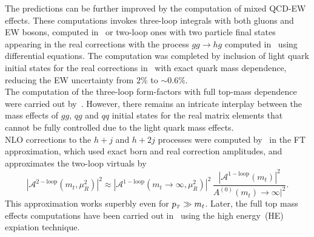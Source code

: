 The predictions can be further improved by the computation of mixed QCD-EW effects. These computations invokes three-loop integrals with both gluons and EW bosons, computed in~\cite{Bonetti:2017ovy} or two-loop ones with two particle final states appearing in the real corrections with the process $ gg \to hg$ computed in~\cite{Bonetti:2020hqh} using differential equations. The computation was completed by inclusion of light quark initial states for the real corrections in~\cite{Becchetti:2020wof} with exact quark mass dependence, reducing the EW uncertainty from $2\%$ to $ \sim 0.6\%$.  \\ The computation of the three-loop form-factors with full top-mass dependence  were carried out by~\cite{Czakon:2020vql,Czakon:2021yub}. However, there remains an intricate interplay between the mass effects of $gg$, $qg$ and $qq$ initial states for the real matrix elements that cannot be fully controlled due to the light quark mass effects. \\ NLO corrections to the $h +j$ and $ h+2j$ processes were computed by~\cite{Maltoni:2014eza} in the FT approximation, which used exact born and real correction amplitudes, and approximates the two-loop virtuals by
\begin{equation}
|	\mathcal A^{\mathrm{2-loop}}(m_t,\mu_R^2) |^2 \approx  |	\mathcal A^{\mathrm{1-loop}}(m_t\to \infty,\mu_R^2) |^2\, \frac{|	\mathcal A^{\mathrm{1-loop}}(m_t) |^2}{A^{\mathrm{(0)}}(m_t)\to \infty |^2}. 
\end{equation}
This approximation works superbly even for $ p_{\scriptscriptstyle T} \gg m_t$. Later, the full top mass effects computations have been carried out in~\cite{Kudashkin:2017skd,Lindert:2018iug,PhysRevLett.120.162001} using the high energy~(HE) expiation technique. 
